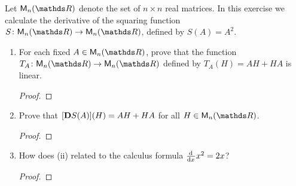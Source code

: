 \documentclass{../homework}
\date{Thursday 3/28}
\author{}
\begin{document}
\begin{Exercise}
	Let \(\M_n(\R)\) denote the set of \(n \times n\) real matrices.  In
  this exercise we calculate the derivative of the squaring function
  \(S \colon \M_n(\R) \to \M_n(\R)\), defined by \(S(A) = A^2\).
	\begin{enumerate}
  \item For each fixed \(A \in \M_n(\R)\), prove that the function
    \(T_A \colon \M_n(\R) \to \M_n(\R)\) defined by \(T_A(H) = AH+ HA\) is
    linear.

    \begin{solution}
      \begin{proof}

      \end{proof}
    \end{solution}

  \item Prove that \([{\bf D}S(A)](H) = AH+HA\) for all
    \(H \in \M_n(\R)\).

    \begin{solution}
      \begin{proof}

      \end{proof}
    \end{solution}

  \item How does (ii) related to the calculus formula
    \(\frac{\mathop{}\! \mathrm d^{} {}}{\mathop{}\! \mathrm d {x}^{}} x^2 = 2x\)?

    \begin{solution}
      \begin{proof}

      \end{proof}
    \end{solution}
	\end{enumerate}
\end{Exercise}
\end{document}
